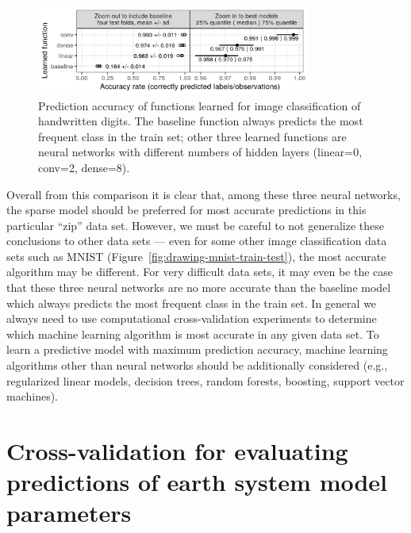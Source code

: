 \documentclass[12pt]{article}
\begin{document}

\begin{figure}
  \centering
  \includegraphics[width=0.8\textwidth]{figure-test-accuracy-both}
  \caption{Prediction accuracy of functions learned for image classification of handwritten digits. The
    baseline function always predicts the most frequent class in the
    train set; other three learned functions are neural
    networks with different numbers of hidden layers (linear=0, conv=2, dense=8).}
  \label{fig:test-accuracy}
\end{figure}

Overall from this comparison it is clear that, among these three
neural networks, the sparse model should be
preferred for most accurate predictions in this particular ``zip''
data set. However, we must be careful to not generalize these
conclusions to other data sets --- even for some other image
classification data sets such as MNIST
(Figure~\ref{fig:drawing-mnist-train-test}), the most accurate
algorithm may be different. For very difficult data sets, it
may even be the case that these three neural networks are no more accurate
than the baseline model which always predicts the most frequent class
in the train set. In general we always need to use computational
cross-validation experiments to determine which machine learning
algorithm is most accurate in any given data set. To learn a
predictive model with maximum prediction accuracy, machine learning
algorithms other than neural networks should be additionally
considered (e.g., regularized linear models, decision trees, random
forests, boosting, support vector machines).

\section{Cross-validation for evaluating predictions of earth system model parameters}
\end{document}
